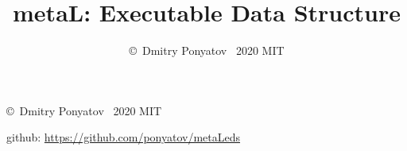 

\author{\copyright\ Dmitry Ponyatov \ 2020 MIT}
\title{metaL: Executable Data Structure}




\tableofcontents\secdown
\bigskip
\copyright\ Dmitry Ponyatov \ 2020 MIT

github: \url{https://github.com/ponyatov/metaLeds}
\cleardoublepage



